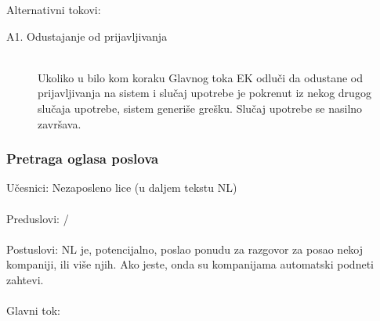 \noindent Alternativni tokovi: 
\begin{description}
	\item[A1. Odustajanje od prijavljivanja] ~\\
		Ukoliko u bilo kom koraku Glavnog toka EK odlu\v ci da odustane od prijavljivanja na sistem i slu\v caj upotrebe je pokrenut iz nekog drugog slu\v caja upotrebe, sistem generi\v se gre\v sku. Slu\v caj upotrebe se nasilno zavr\v sava.
\end{description}

\subsubsection{Pretraga oglasa poslova}
\label{su: pretraga oglasa poslova}

\noindent U\v cesnici: Nezaposleno lice (u daljem tekstu NL)
\\
\\ Preduslovi: /
\\
\\ Postuslovi: NL je, potencijalno, poslao ponudu za razgovor za posao nekoj kompaniji, ili vi\v se njih. Ako jeste, onda su kompanijama automatski podneti zahtevi.
\\ 
\\ Glavni tok:
